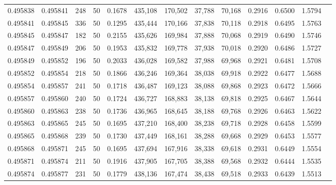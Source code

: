 \begin{tabular}{rrrrrrrrrrrrr}
0.495838 & 0.495841 &   248 &  50 &                                     0.1678 & 435,108 & 170,502 &  37,788 &  70,168 & 0.2916 & 0.6500 & 1.5794 \\
0.495841 & 0.495845 &   336 &  50 &                                     0.1295 & 435,444 & 170,166 &  37,838 &  70,118 & 0.2918 & 0.6495 & 1.5763 \\
0.495845 & 0.495847 &   182 &  50 &                                     0.2155 & 435,626 & 169,984 &  37,888 &  70,068 & 0.2919 & 0.6490 & 1.5746 \\
0.495847 & 0.495849 &   206 &  50 &                                     0.1953 & 435,832 & 169,778 &  37,938 &  70,018 & 0.2920 & 0.6486 & 1.5727 \\
0.495849 & 0.495852 &   196 &  50 &                                     0.2033 & 436,028 & 169,582 &  37,988 &  69,968 & 0.2921 & 0.6481 & 1.5708 \\
0.495852 & 0.495854 &   218 &  50 &                                     0.1866 & 436,246 & 169,364 &  38,038 &  69,918 & 0.2922 & 0.6477 & 1.5688 \\
0.495854 & 0.495857 &   241 &  50 &                                     0.1718 & 436,487 & 169,123 &  38,088 &  69,868 & 0.2923 & 0.6472 & 1.5666 \\
0.495857 & 0.495860 &   240 &  50 &                                     0.1724 & 436,727 & 168,883 &  38,138 &  69,818 & 0.2925 & 0.6467 & 1.5644 \\
0.495860 & 0.495863 &   238 &  50 &                                     0.1736 & 436,965 & 168,645 &  38,188 &  69,768 & 0.2926 & 0.6463 & 1.5622 \\
0.495863 & 0.495865 &   245 &  50 &                                     0.1695 & 437,210 & 168,400 &  38,238 &  69,718 & 0.2928 & 0.6458 & 1.5599 \\
0.495865 & 0.495868 &   239 &  50 &                                     0.1730 & 437,449 & 168,161 &  38,288 &  69,668 & 0.2929 & 0.6453 & 1.5577 \\
0.495868 & 0.495871 &   245 &  50 &                                     0.1695 & 437,694 & 167,916 &  38,338 &  69,618 & 0.2931 & 0.6449 & 1.5554 \\
0.495871 & 0.495874 &   211 &  50 &                                     0.1916 & 437,905 & 167,705 &  38,388 &  69,568 & 0.2932 & 0.6444 & 1.5535 \\
0.495874 & 0.495877 &   231 &  50 &                                     0.1779 & 438,136 & 167,474 &  38,438 &  69,518 & 0.2933 & 0.6439 & 1.5513 \\

\end{tabular}

